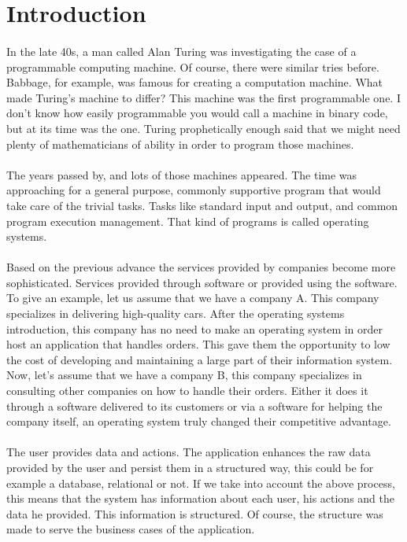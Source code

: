 \section{Introduction}
\paragraph{} In the late 40s, a man called Alan Turing was investigating the case of a programmable computing machine. Of course, there were similar tries before. Babbage, for example, was famous for creating a computation machine. What made Turing's machine to differ? This machine was the first programmable one. I don't know how easily programmable you would call a machine in binary code, but at its time was the one. Turing prophetically enough said that we might need plenty of mathematicians of ability in order to program those machines.

\paragraph{} The years passed by, and lots of those machines appeared. The time was approaching for a general purpose, commonly supportive program that would take care of the trivial tasks. Tasks like standard input and output, and common program execution management. That kind of programs is called operating systems.

\paragraph{} Based on the previous advance the services provided by companies become more sophisticated. Services provided through software or provided using the software. To give an example, let us assume that we have a company A. This company specializes in delivering high-quality cars. After the operating systems introduction, this company has no need to make an operating system in order host an application that handles orders. This gave them the opportunity to low the cost of developing and maintaining a large part of their information system. Now, let's assume that we have a company B, this company specializes in consulting other companies on how to handle their orders. Either it does it through a software delivered to its customers or via a software for helping the company itself, an operating system truly changed their competitive advantage.

\paragraph{} The user provides data and actions. The application enhances the raw data provided by the user and persist them in a structured way, this could be for example a database, relational or not. If we take into account the above process, this means that the system has information about each user, his actions and the data he provided. This information is structured. Of course, the structure was made to serve the business cases of the application.

